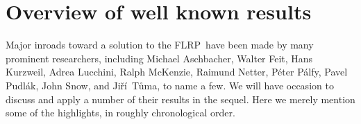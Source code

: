 \documentclass[cm,dissertation,actual,final]{uhthesis}
\theoremstyle{plain}
\theoremstyle{definition}
\theoremstyle{remark}
\numberwithin{theorem}{section}
\numberwithin{claim}{chapter}
\numberwithin{equation}{section}
\numberwithin{conjecture}{chapter}
\newcommand{\indexTuma}{\index{T\r{u}ma, Ji\v{r}\'i}}
\newcommand{\Jiri}{Ji\v{r}\'i}
\newcommand{\Tuma}{T\r{u}ma}
\newcommand{\Palfy}{P\'alfy}
\newcommand{\Pudlak}{Pudl\'ak}
\newcommand{\<}{\ensuremath{\langle}}
\renewcommand{\>}{\ensuremath{\rangle}}
\newcommand{\FLRP}{{\small FLRP}}
\newcommand{\0}{\ensuremath{\mathbf{0}}}
\newcommand{\1}{\ensuremath{\mathbf{1}}}
\newcommand{\2}{\ensuremath{\mathbf{2}}}
\newcommand{\3}{\ensuremath{\mathbf{3}}}
\newcommand{\4}{\ensuremath{\mathbf{4}}}
\newcommand{\5}{\ensuremath{\mathbf{5}}}
\begin{document}
\section{Overview of well known results}
\label{sec:overv-known-results}
Major inroads toward a solution to the \FLRP\ have been made by many prominent
researchers, including 
%
Michael Aschbacher, 
%
Walter Feit, 
%
Hans Kurzweil, 
%
Adrea Lucchini, 
%
Ralph McKenzie, 
%
Raimund Netter,
%
P\'eter \Palfy,
%
Pavel \Pudlak, 
%
John Snow, and 
\indexTuma%
\Jiri\ \Tuma, to name a few. 
We will have occasion to discuss and apply a number of their results in the
sequel.  Here we merely mention some of the highlights, in roughly chronological
order.  
\end{document}
